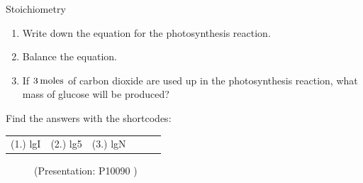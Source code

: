 \begin{exercises}{  Stoichiometry
      }
\begin{enumerate}[noitemsep, label=\textbf{\arabic*}. ]
\begin{enumerate}[noitemsep, label=\textbf{\alph*}. ]
            \label{m38712*uid104}\item Write down the equation for the photosynthesis reaction.
\label{m38712*uid105}\item Balance the equation.
\label{m38712*uid106}\item If $3\phantom{\rule{2pt}{0ex}}\text{moles}$ of carbon dioxide are used up in the photosynthesis reaction, what mass of glucose will be produced?
\end{enumerate}
                \end{enumerate}
 \label{m38712*cid10}
\par {} Find the answers with the shortcodes:
 \par \begin{tabular}[h]{cccccc}
 (1.) lgI  &  (2.) lg5  &  (3.) lgN  & \end{tabular}
\end{exercises}

    \label{m38712*eip-269} 
    \setcounter{subfigure}{0}
	\begin{figure}[H] %
    \label{m38712*slidesharemedia}\label{m38712*slideshareflash}
             { (Presentation:  P10090 )}
 \end{figure}       \par
\vspace{-2cm}
